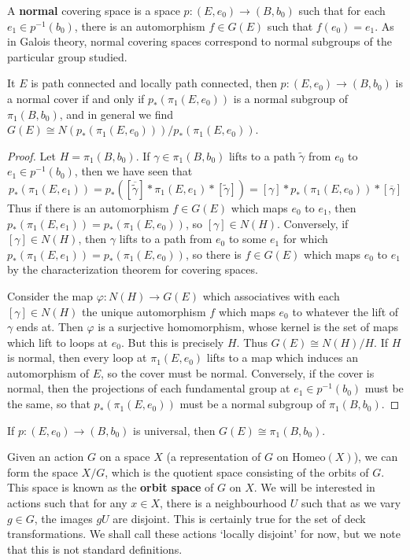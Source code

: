 A {\bf normal} covering space is a space $p:(E,e_0) \to (B,b_0)$ such that for each $e_1 \in p^{-1}(b_0)$, there is an automorphism $f \in G(E)$ such that $f(e_0) = e_1$. As in Galois theory, normal covering spaces correspond to normal subgroups of the particular group studied.

\begin{theorem}
    It $E$ is path connected and locally path connected, then $p: (E,e_0) \to (B,b_0)$ is a normal cover if and only if $p_*(\pi_1(E,e_0))$ is a normal subgroup of $\pi_1(B,b_0)$, and in general we find $G(E) \cong N(p_*(\pi_1(E,e_0)))/p_*(\pi_1(E,e_0))$.
\end{theorem}
\begin{proof}
    Let $H = \pi_1(B,b_0)$. If $\gamma \in \pi_1(B,b_0)$ lifts to a path $\tilde{\gamma}$ from $e_0$ to $e_1 \in p^{-1}(b_0)$, then we have seen that
    \[ p_*(\pi_1(E,e_1)) = p_*([\overline{\tilde{\gamma}}] * \pi_1(E,e_1) * [\tilde{\gamma}]) =  [\gamma] * p_*(\pi_1(E,e_0)) * [\overline{\gamma}] \]
    Thus if there is an automorphism $f \in G(E)$ which maps $e_0$ to $e_1$, then $p_*(\pi_1(E,e_1)) = p_*(\pi_1(E,e_0))$, so $[\gamma] \in N(H)$. Conversely, if $[\gamma] \in N(H)$, then $\gamma$ lifts to a path from $e_0$ to some $e_1$ for which $p_*(\pi_1(E,e_1)) = p_*(\pi_1(E,e_0))$, so there is $f \in G(E)$ which maps $e_0$ to $e_1$ by the characterization theorem for covering spaces.

    Consider the map $\varphi: N(H) \to G(E)$ which associatives with each $[\gamma] \in N(H)$ the unique automorphism $f$ which maps $e_0$ to whatever the lift of $\gamma$ ends at. Then $\varphi$ is a surjective homomorphism, whose kernel is the set of maps which lift to loops at $e_0$. But this is precisely $H$. Thus $G(E) \cong N(H)/H$. If $H$ is normal, then every loop at $\pi_1(E,e_0)$ lifts to a map which induces an automorphism of $E$, so the cover must be normal. Conversely, if the cover is normal, then the projections of each fundamental group at $e_1 \in p^{-1}(b_0)$ must be the same, so that $p_*(\pi_1(E,e_0))$ must be a normal subgroup of $\pi_1(B,b_0)$.
\end{proof}

\begin{corollary}
    If $p: (E,e_0) \to (B,b_0)$ is universal, then $G(E) \cong \pi_1(B,b_0)$.
\end{corollary}

Given an action $G$ on a space $X$ (a representation of $G$ on $\text{Homeo}(X)$), we can form the space $X/G$, which is the quotient space consisting of the orbits of $G$. This space is known as the {\bf orbit space} of $G$ on $X$. We will be interested in actions such that for any $x \in X$, there is a neighbourhood $U$ such that as we vary $g \in G$, the images $gU$ are disjoint. This is certainly true for the set of deck transformations. We shall call these actions `locally disjoint' for now, but we note that this is not standard definitions.

